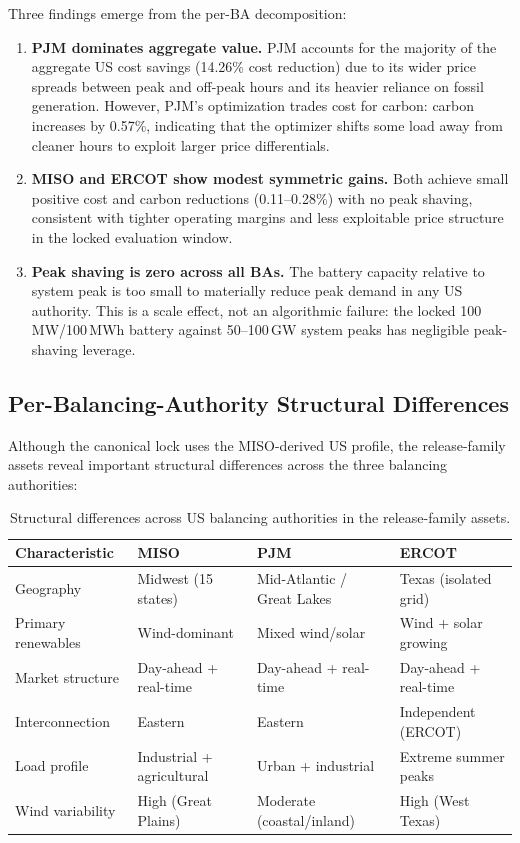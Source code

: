 \documentclass[11pt,a4paper]{article}
\begin{document}
Three findings emerge from the per-BA decomposition:

\begin{enumerate}[leftmargin=*,topsep=2pt,itemsep=1pt]
\item \textbf{PJM dominates aggregate value.} PJM accounts for the majority of the aggregate US cost savings (14.26\% cost reduction) due to its wider price spreads between peak and off-peak hours and its heavier reliance on fossil generation. However, PJM's optimization trades cost for carbon: carbon increases by 0.57\%, indicating that the optimizer shifts some load away from cleaner hours to exploit larger price differentials.
\item \textbf{MISO and ERCOT show modest symmetric gains.} Both achieve small positive cost and carbon reductions (0.11--0.28\%) with no peak shaving, consistent with tighter operating margins and less exploitable price structure in the locked evaluation window.
\item \textbf{Peak shaving is zero across all BAs.} The battery capacity relative to system peak is too small to materially reduce peak demand in any US authority. This is a scale effect, not an algorithmic failure: the locked 100\,MW/100\,MWh battery against 50--100\,GW system peaks has negligible peak-shaving leverage.
\end{enumerate}

\subsection{Per-Balancing-Authority Structural Differences}

Although the canonical lock uses the MISO-derived US profile, the release-family assets reveal important structural differences across the three balancing authorities:

\begin{table}[htbp]
\centering\small
\caption{Structural differences across US balancing authorities in the release-family assets.}
\label{tab:ba_structure}
\begin{tabular}{p{2.5cm}p{3.8cm}p{3.8cm}p{3.0cm}}
\toprule
Characteristic & MISO & PJM & ERCOT \\
\midrule
Geography & Midwest (15 states) & Mid-Atlantic / Great Lakes & Texas (isolated grid) \\
Primary renewables & Wind-dominant & Mixed wind/solar & Wind + solar growing \\
Market structure & Day-ahead + real-time & Day-ahead + real-time & Day-ahead + real-time \\
Interconnection & Eastern & Eastern & Independent (ERCOT) \\
Load profile & Industrial + agricultural & Urban + industrial & Extreme summer peaks \\
Wind variability & High (Great Plains) & Moderate (coastal/inland) & High (West Texas) \\
\bottomrule
\end{tabular}
\end{table}
\end{document}

